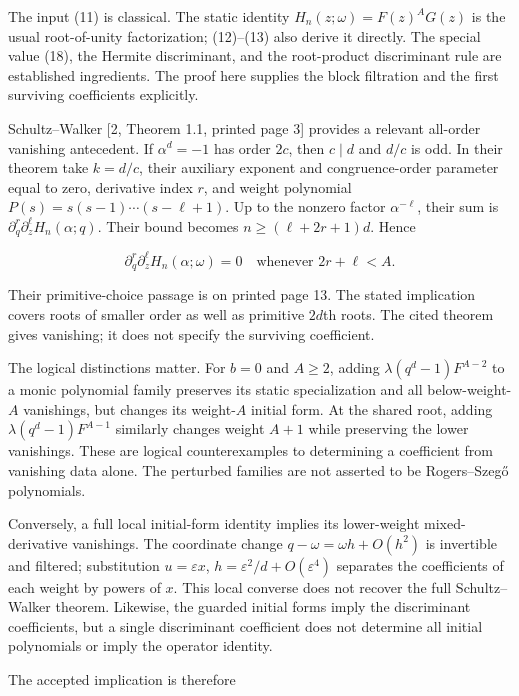 \documentclass[
  11pt,
]{article}
\begin{document}
The input (11) is classical. The static identity
\(H_n(z;\omega)=F(z)^AG(z)\) is the usual root-of-unity factorization;
(12)--(13) also derive it directly. The special value (18), the Hermite
discriminant, and the root-product discriminant rule are established
ingredients. The proof here supplies the block filtration and the first
surviving coefficients explicitly.

Schultz--Walker {[}2, Theorem 1.1, printed page 3{]} provides a relevant
all-order vanishing antecedent. If \(\alpha^d=-1\) has order \(2c\),
then \(c\mid d\) and \(d/c\) is odd. In their theorem take \(k=d/c\),
their auxiliary exponent and congruence-order parameter equal to zero,
derivative index \(r\), and weight polynomial
\(P(s)=s(s-1)\cdots(s-\ell+1)\). Up to the nonzero factor
\(\alpha^{-\ell}\), their sum is
\(\partial_q^r\partial_z^\ell H_n(\alpha;q)\). Their bound becomes
\(n\geq(\ell+2r+1)d\). Hence

\[
\partial_q^r\partial_z^\ell H_n(\alpha;\omega)=0
\quad\text{whenever }2r+\ell<A. \tag{28}
\]

Their primitive-choice passage is on printed page 13. The stated
implication covers roots of smaller order as well as primitive \(2d\)th
roots. The cited theorem gives vanishing; it does not specify the
surviving coefficient.

The logical distinctions matter. For \(b=0\) and \(A\geq2\), adding
\(\lambda(q^d-1)F^{A-2}\) to a monic polynomial family preserves its
static specialization and all below-weight-\(A\) vanishings, but changes
its weight-\(A\) initial form. At the shared root, adding
\(\lambda(q^d-1)F^{A-1}\) similarly changes weight \(A+1\) while
preserving the lower vanishings. These are logical counterexamples to
determining a coefficient from vanishing data alone. The perturbed
families are not asserted to be Rogers--Szegő polynomials.

Conversely, a full local initial-form identity implies its lower-weight
mixed-derivative vanishings. The coordinate change
\(q-\omega=\omega h+O(h^2)\) is invertible and filtered; substitution
\(u=\varepsilon x\), \(h=\varepsilon^2/d+O(\varepsilon^4)\) separates
the coefficients of each weight by powers of \(x\). This local converse
does not recover the full Schultz--Walker theorem. Likewise, the guarded
initial forms imply the discriminant coefficients, but a single
discriminant coefficient does not determine all initial polynomials or
imply the operator identity.

The accepted implication is therefore
\end{document}
